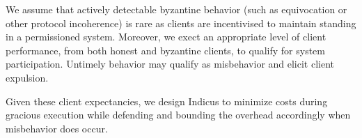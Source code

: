 We assume that actively detectable byzantine behavior (such as equivocation or other protocol incoherence) is rare as clients are incentivised to maintain standing in a permissioned system.
Moreover, we exect an appropriate level of client performance, from both honest and byzantine clients, to qualify for system participation. Untimely behavior may qualify as misbehavior and elicit client expulsion. 

Given these client expectancies, we design Indicus to minimize costs during gracious execution while defending and bounding the overhead accordingly when misbehavior does occur.
